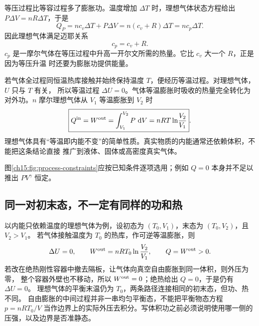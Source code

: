 {等压过程比等容过程多了膨胀功。温度增加 $\Delta T$ 时，理想气体状态方程给出
$P\Delta V=nR\Delta T$，于是
\begin{equation*}
  Q_P=n c_v\Delta T+P\Delta V
  =n(c_v+R)\Delta T=n c_p\Delta T.
\end{equation*}
因此理想气体满足迈耶关系
\begin{equation*}
  \boxed{c_p=c_v+R}.
\end{equation*}
$c_p$ 是一摩尔气体在等压过程中升高一开尔文所需的热量。它比 $c_v$ 大一个 $R$，正是因为等压升温
时还要为膨胀功提供能量。

若气体全过程同恒温热库接触并始终保持温度 $T$，便经历等温过程。对理想气体，$U$ 只与 $T$ 有关，
所以等温过程 $\Delta U=0$。气体等温膨胀时吸收的热量完全转化为对外功。$n$ 摩尔理想气体从 $V_1$
等温膨胀到 $V_2$ 时
\begin{equation}
  \boxed{Q^{\rm in}=W^{\rm out}
  =\int_{V_1}^{V_2}P\,\dd V
  =nRT\ln\!\frac{V_2}{V_1}}. \label{ch15:eq:s29-20-5}
\end{equation}
理想气体具有“等温即内能不变”的简单性质。真实物质的内能通常还依赖体积，不能把这条结论直接
推广到液体、固体或高密度真实气体。

\par\noindent\begin{minipage}{\linewidth}
\processComparisonDiagram
{}\label{ch15:fig:process-constraints}
\end{minipage}\par\medskip
图\ref{ch15:fig:process-constraints}应按已知条件逐项选用；例如 $Q=0$ 本身并不足以推出 $PV^\gamma$ 恒定。

\subsection{同一对初末态，不一定有同样的功和热}

以内能只依赖温度的理想气体为例，设初态为 $(T_0,V_1)$，末态为 $(T_0,V_2)$，且 $V_2>V_1$。
若气体接触温度为 $T_0$ 的热库，作可逆等温膨胀，则
\[
 \Delta U=0,\qquad W^{\rm out}=nRT_0\ln\frac{V_2}{V_1},\qquad Q=W^{\rm out}>0.
\]
若改在绝热刚性容器中撤去隔板，让气体向真空自由膨胀到同一体积，则外压为零，
整个容器外壁也不移动，所以 $W^{\rm out}=0$；绝热给出 $Q=0$，于是仍有 $\Delta U=0$。
理想气体的平衡末温仍为 $T_0$，两条路径连接相同的初末态，但功、热不同。
自由膨胀的中间过程并非一串均匀平衡态，不能把平衡物态方程 $p=nRT_0/V$
当作边界上的实际外压去积分。写体积功之前必须说明使用哪一侧的压强，以及边界是否准静态。

}

